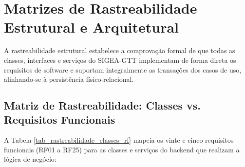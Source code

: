 \chapter{Matrizes de Rastreabilidade Estrutural e Arquitetural}
\label{cap_matrizes_rastreabilidade}

A rastreabilidade estrutural estabelece a comprovação formal de que todas as classes, interfaces e serviços do SIGEA-GTT implementam de forma direta os requisitos de software e suportam integralmente as transações dos casos de uso, alinhando-se à persistência físico-relacional.

\section{Matriz de Rastreabilidade: Classes vs. Requisitos Funcionais}
\label{sec_matriz_classes_rf}

A Tabela \ref{tab_rastreabilidade_classes_rf} mapeia os vinte e cinco requisitos funcionais (RF01 a RF25) para as classes e serviços do backend que realizam a lógica de negócio:

